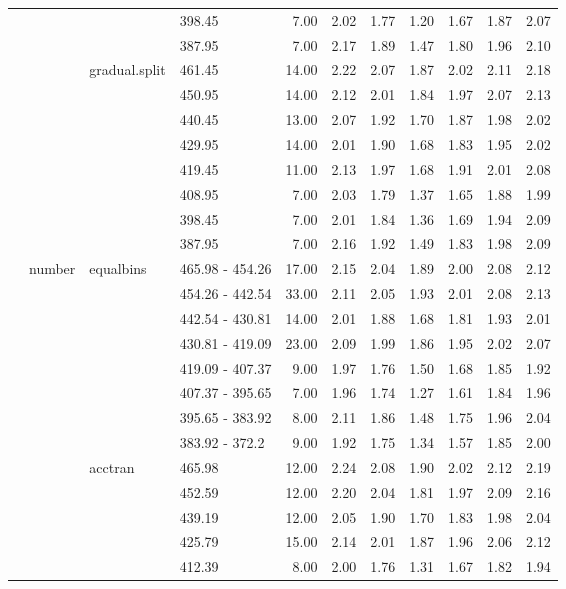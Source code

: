 \begin{longtable}{llllrrrrrrr}
   &  &  & 398.45 & 7.00 & 2.02 & 1.77 & 1.20 & 1.67 & 1.87 & 2.07 \\ 
   &  &  & 387.95 & 7.00 & 2.17 & 1.89 & 1.47 & 1.80 & 1.96 & 2.10 \\ 
   &  & gradual.split & 461.45 & 14.00 & 2.22 & 2.07 & 1.87 & 2.02 & 2.11 & 2.18 \\ 
   &  &  & 450.95 & 14.00 & 2.12 & 2.01 & 1.84 & 1.97 & 2.07 & 2.13 \\ 
   &  &  & 440.45 & 13.00 & 2.07 & 1.92 & 1.70 & 1.87 & 1.98 & 2.02 \\ 
   &  &  & 429.95 & 14.00 & 2.01 & 1.90 & 1.68 & 1.83 & 1.95 & 2.02 \\ 
   &  &  & 419.45 & 11.00 & 2.13 & 1.97 & 1.68 & 1.91 & 2.01 & 2.08 \\ 
   &  &  & 408.95 & 7.00 & 2.03 & 1.79 & 1.37 & 1.65 & 1.88 & 1.99 \\ 
   &  &  & 398.45 & 7.00 & 2.01 & 1.84 & 1.36 & 1.69 & 1.94 & 2.09 \\ 
   &  &  & 387.95 & 7.00 & 2.16 & 1.92 & 1.49 & 1.83 & 1.98 & 2.09 \\ 
   & number & equalbins & 465.98 - 454.26 & 17.00 & 2.15 & 2.04 & 1.89 & 2.00 & 2.08 & 2.12 \\ 
   &  &  & 454.26 - 442.54 & 33.00 & 2.11 & 2.05 & 1.93 & 2.01 & 2.08 & 2.13 \\ 
   &  &  & 442.54 - 430.81 & 14.00 & 2.01 & 1.88 & 1.68 & 1.81 & 1.93 & 2.01 \\ 
   &  &  & 430.81 - 419.09 & 23.00 & 2.09 & 1.99 & 1.86 & 1.95 & 2.02 & 2.07 \\ 
   &  &  & 419.09 - 407.37 & 9.00 & 1.97 & 1.76 & 1.50 & 1.68 & 1.85 & 1.92 \\ 
   &  &  & 407.37 - 395.65 & 7.00 & 1.96 & 1.74 & 1.27 & 1.61 & 1.84 & 1.96 \\ 
   &  &  & 395.65 - 383.92 & 8.00 & 2.11 & 1.86 & 1.48 & 1.75 & 1.96 & 2.04 \\ 
   &  &  & 383.92 - 372.2 & 9.00 & 1.92 & 1.75 & 1.34 & 1.57 & 1.85 & 2.00 \\ 
   &  & acctran & 465.98 & 12.00 & 2.24 & 2.08 & 1.90 & 2.02 & 2.12 & 2.19 \\ 
   &  &  & 452.59 & 12.00 & 2.20 & 2.04 & 1.81 & 1.97 & 2.09 & 2.16 \\ 
   &  &  & 439.19 & 12.00 & 2.05 & 1.90 & 1.70 & 1.83 & 1.98 & 2.04 \\ 
   &  &  & 425.79 & 15.00 & 2.14 & 2.01 & 1.87 & 1.96 & 2.06 & 2.12 \\ 
   &  &  & 412.39 & 8.00 & 2.00 & 1.76 & 1.31 & 1.67 & 1.82 & 1.94 \\ 

\end{longtable}

